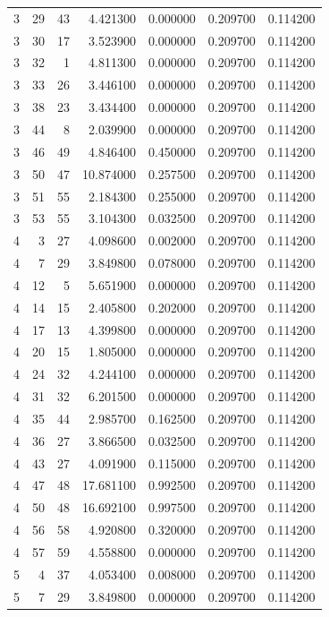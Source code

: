 \begin{table}
\begin{tabular}{rrrrrrr}
3 & 29 & 43 & 4.421300 & 0.000000 & 0.209700 & 0.114200 \\
3 & 30 & 17 & 3.523900 & 0.000000 & 0.209700 & 0.114200 \\
3 & 32 & 1 & 4.811300 & 0.000000 & 0.209700 & 0.114200 \\
3 & 33 & 26 & 3.446100 & 0.000000 & 0.209700 & 0.114200 \\
3 & 38 & 23 & 3.434400 & 0.000000 & 0.209700 & 0.114200 \\
3 & 44 & 8 & 2.039900 & 0.000000 & 0.209700 & 0.114200 \\
3 & 46 & 49 & 4.846400 & 0.450000 & 0.209700 & 0.114200 \\
3 & 50 & 47 & 10.874000 & 0.257500 & 0.209700 & 0.114200 \\
3 & 51 & 55 & 2.184300 & 0.255000 & 0.209700 & 0.114200 \\
3 & 53 & 55 & 3.104300 & 0.032500 & 0.209700 & 0.114200 \\
4 & 3 & 27 & 4.098600 & 0.002000 & 0.209700 & 0.114200 \\
4 & 7 & 29 & 3.849800 & 0.078000 & 0.209700 & 0.114200 \\
4 & 12 & 5 & 5.651900 & 0.000000 & 0.209700 & 0.114200 \\
4 & 14 & 15 & 2.405800 & 0.202000 & 0.209700 & 0.114200 \\
4 & 17 & 13 & 4.399800 & 0.000000 & 0.209700 & 0.114200 \\
4 & 20 & 15 & 1.805000 & 0.000000 & 0.209700 & 0.114200 \\
4 & 24 & 32 & 4.244100 & 0.000000 & 0.209700 & 0.114200 \\
4 & 31 & 32 & 6.201500 & 0.000000 & 0.209700 & 0.114200 \\
4 & 35 & 44 & 2.985700 & 0.162500 & 0.209700 & 0.114200 \\
4 & 36 & 27 & 3.866500 & 0.032500 & 0.209700 & 0.114200 \\
4 & 43 & 27 & 4.091900 & 0.115000 & 0.209700 & 0.114200 \\
4 & 47 & 48 & 17.681100 & 0.992500 & 0.209700 & 0.114200 \\
4 & 50 & 48 & 16.692100 & 0.997500 & 0.209700 & 0.114200 \\
4 & 56 & 58 & 4.920800 & 0.320000 & 0.209700 & 0.114200 \\
4 & 57 & 59 & 4.558800 & 0.000000 & 0.209700 & 0.114200 \\
5 & 4 & 37 & 4.053400 & 0.008000 & 0.209700 & 0.114200 \\
5 & 7 & 29 & 3.849800 & 0.000000 & 0.209700 & 0.114200 \\

\end{tabular}
\end{table}
